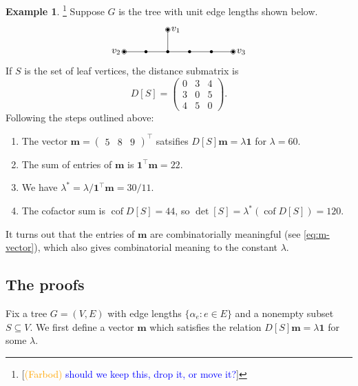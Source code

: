 \documentclass[12pt]{amsart}
\theoremstyle{definition}
\newtheorem{eg}[thm]{Example}
\newcommand{\bone}{\mathbf{1}}
\newcommand{\boldm}{\mathbf{m}}
\newcommand{\tr}{\intercal}
\DeclareMathOperator{\cof}{cof}
\newcommand\farbod[1]{\footnote{[\textcolor{orange}{(Farbod)} \textcolor{blue}{#1}]}}
\begin{document}
\begin{eg}\farbod{should we keep this, drop it, or move it?}
Suppose $G$ is the tree with unit edge lengths shown below.
\[
\begin{tikzpicture}[scale=0.8]
	\coordinate (1) at (0,0);
	\coordinate (A) at (1,0);
	\coordinate (B) at (2,0);
	\coordinate (C) at (3,0);
	\coordinate (D) at (4,0);
	\coordinate (2) at (5,0);
	\coordinate (3) at (2,1);
	
	\foreach \c in {1,2,3,A,B,C,D} {
		\fill (\c) circle (2pt);
	}
	\foreach \c in {1,2,3} {
		\draw (\c) circle (3pt);
	}

	\draw (1) -- (A);
	\draw (A) -- (B);
	\draw (B) -- (3);
	\draw (B) -- (C);
	\draw (C) -- (D);
	\draw (D) -- (2);
	
	\foreach \c/\dir/\label in {1/left/v_2,2/right/v_3,3/right/v_1} {
		\node[\dir=0.2] at (\c) {$\label$};
	}
\end{tikzpicture}
\]
If $S$ is the set of leaf vertices, the distance submatrix is 
\[
D[S] = \begin{pmatrix}
0 & 3 & 4 \\
3 & 0 & 5 \\
4 & 5 & 0
\end{pmatrix}.
\]
Following the steps outlined above:
\begin{enumerate}[label=(\roman*)]
\item 
The vector $\boldm = \begin{pmatrix} 5 & 8 & 9 \end{pmatrix}^\tr$
satsifies $D[S] \boldm = \lambda \bone$ for $\lambda = 60$.

\item 
The sum of entries of $\boldm$ is $\bone^\tr \boldm = 22$.

\item 
We have $\displaystyle \lambda^* = {\lambda}/{\bone^\tr \boldm} = {30}/{11}$.

\item 
The cofactor sum is $\cof D[S] = 44$, so $\det[S] = \lambda^*(\cof D[S]) = 120$.
\end{enumerate}
\end{eg}
It turns out that the entries of $\boldm$ are combinatorially meaningful (see \eqref{eq:m-vector}),
which also gives combinatorial meaning to
the constant $\lambda$.

\subsection{The proofs}
Fix a tree $G = (V,E)$ with edge lengths $\{\alpha_e \colon e \in E\}$ and a nonempty subset $S \subseteq V$.
We first define a vector $\boldm$ which satisfies the relation $D[S] \boldm = \lambda \bone$ for some $\lambda$.
\end{document}
